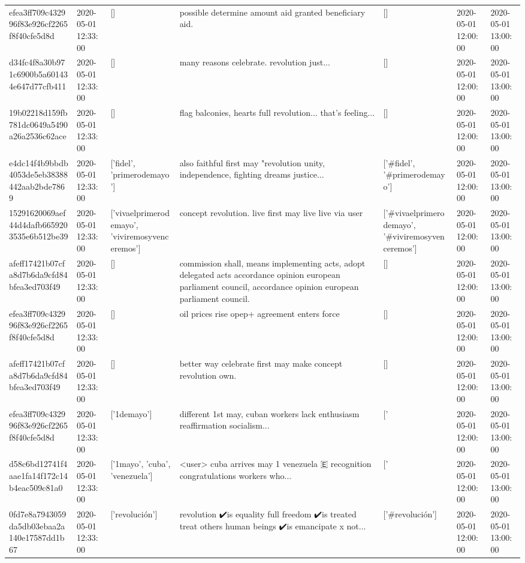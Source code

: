 \begin{tabular}{lllllll}
efea3ff709c432996f83e926cf2265f8f40cfe5d8d & 2020-05-01 12:33:00 & [] & possible determine amount aid granted beneficiary aid. & [] & 2020-05-01 12:00:00 & 2020-05-01 13:00:00 \\
d34fc4f8a30b971c6900b5a601434e647d77cfb411 & 2020-05-01 12:33:00 & [] & many reasons celebrate. revolution just... & [] & 2020-05-01 12:00:00 & 2020-05-01 13:00:00 \\
19b02218d159fb781dc0649a5490a26a2536c62ace & 2020-05-01 12:33:00 & [] & flag balconies, hearts full revolution... that's feeling... & [] & 2020-05-01 12:00:00 & 2020-05-01 13:00:00 \\
e4dc14f4b9bbdb4053de5eb38388442aab2bde7869 & 2020-05-01 12:33:00 & ['fidel', 'primerodemayo'] & also faithful first may "revolution unity, independence, fighting dreams justice... & ['#fidel', '#primerodemayo'] & 2020-05-01 12:00:00 & 2020-05-01 13:00:00 \\
15291620069aef44d4dafb6659203535e6b512be39 & 2020-05-01 12:33:00 & ['vivaelprimerodemayo', 'viviremosyvenceremos'] & concept revolution. live first may live live via user & ['#vivaelprimerodemayo', '#viviremosyvenceremos'] & 2020-05-01 12:00:00 & 2020-05-01 13:00:00 \\
afeff17421b07cfa8d7b6da9cfd84bfea3ed703f49 & 2020-05-01 12:33:00 & [] & commission shall, means implementing acts, adopt delegated acts accordance opinion european parliament council, accordance opinion european parliament council. & [] & 2020-05-01 12:00:00 & 2020-05-01 13:00:00 \\
efea3ff709c432996f83e926cf2265f8f40cfe5d8d & 2020-05-01 12:33:00 & [] & oil prices rise opep+ agreement enters force & [] & 2020-05-01 12:00:00 & 2020-05-01 13:00:00 \\
afeff17421b07cfa8d7b6da9cfd84bfea3ed703f49 & 2020-05-01 12:33:00 & [] & better way celebrate first may make concept revolution own. & [] & 2020-05-01 12:00:00 & 2020-05-01 13:00:00 \\
efea3ff709c432996f83e926cf2265f8f40cfe5d8d & 2020-05-01 12:33:00 & ['1demayo'] & different 1st may, cuban workers lack enthusiasm reaffirmation socialism... & ['#1demayo'] & 2020-05-01 12:00:00 & 2020-05-01 13:00:00 \\
d58c6bd12741f4aae1fa14f172c14b4eac509c81a0 & 2020-05-01 12:33:00 & ['1mayo', 'cuba', 'venezuela'] & <user> cuba arrives may 1 venezuela 🇪 recognition congratulations workers who... & ['#1mayo', '#cuba', '#venezuela'] & 2020-05-01 12:00:00 & 2020-05-01 13:00:00 \\
0fd7e8a7943059da5db03ebaa2a140e17587dd1b67 & 2020-05-01 12:33:00 & ['revolución'] & revolution ✔️is equality full freedom ✔️is treated treat others human beings ✔️is emancipate x not... & ['#revolución'] & 2020-05-01 12:00:00 & 2020-05-01 13:00:00 \\

\end{tabular}
